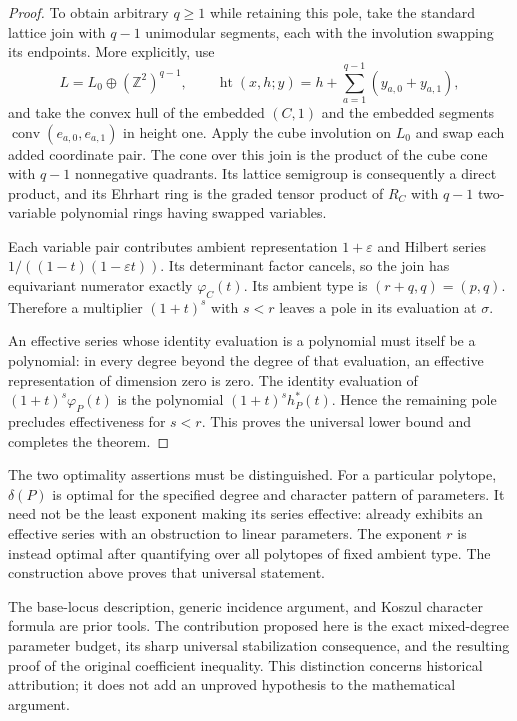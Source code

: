 \documentclass[11pt,a4paper]{article}
\theoremstyle{definition}
\theoremstyle{remark}\newtheorem{remark}[lemma]{Remark}
\begin{document}
\begin{proof}
To obtain arbitrary $q\geq1$ while retaining this pole, take the standard
lattice join with $q-1$ unimodular segments, each with the involution
swapping its endpoints. More explicitly, use
\[
 L=L_0\oplus(\mathbb Z^2)^{q-1},\qquad
 \operatorname{ht}(x,h;y)=h+\sum_{a=1}^{q-1}(y_{a,0}+y_{a,1}),
\]
and take the convex hull of the embedded $(C,1)$ and the embedded
segments $\operatorname{conv}(e_{a,0},e_{a,1})$ in height one. Apply the
cube involution on $L_0$ and swap each added coordinate pair. The cone
over this join is the product of the cube cone with $q-1$ nonnegative
quadrants. Its lattice semigroup is consequently a direct product, and
its Ehrhart ring is the graded tensor product of $R_C$ with $q-1$
two-variable polynomial rings having swapped variables.

Each variable pair contributes ambient representation $1+\varepsilon$
and Hilbert series $1/((1-t)(1-\varepsilon t))$. Its determinant factor
cancels, so the join has equivariant numerator exactly $\varphi_C(t)$.
Its ambient type is $(r+q,q)=(p,q)$. Therefore a multiplier $(1+t)^s$
with $s<r$ leaves a pole in its evaluation at $\sigma$.

An effective series whose identity evaluation is a polynomial must itself
be a polynomial: in every degree beyond the degree of that evaluation,
an effective representation of dimension zero is zero. The identity
evaluation of $(1+t)^s\varphi_P(t)$ is the polynomial
$(1+t)^s h^*_P(t)$. Hence the remaining pole precludes effectiveness for
$s<r$. This proves the universal lower bound and completes the theorem.
\end{proof}

The two optimality assertions must be distinguished. For a particular
polytope, $\delta(P)$ is optimal for the specified degree and character
pattern of parameters. It need not be the least exponent making its
series effective: \cite[Example~5.3]{Clarke26} already exhibits an
effective series with an obstruction to linear parameters. The exponent
$r$ is instead optimal after quantifying over all polytopes of fixed
ambient type. The construction above proves that universal statement.

The base-locus description, generic incidence argument, and Koszul
character formula are prior tools. The contribution proposed here is
the exact mixed-degree parameter budget, its sharp universal
stabilization consequence, and the resulting proof of the original
coefficient inequality. This distinction concerns historical attribution;
it does not add an unproved hypothesis to the mathematical argument.
\end{document}
